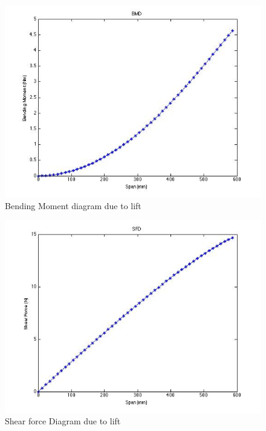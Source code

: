 \begin{figure}[H]
    \begin{center}
      \includegraphics[width=5.1in]{figures/bmd.jpg}
\caption{Bending Moment diagram due to lift}
       \label{fig:BMD}
    \end{center}
\end{figure}
\begin{figure}[H]
    \begin{center}
      \includegraphics[width=5.1in]{figures/liftdistr.jpg}
\caption{Shear force Diagram due to lift}
       \label{fig:SFD}
    \end{center}
\end{figure}
%

